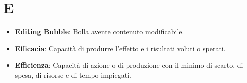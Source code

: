 \section{E}
\begin{itemize}
	\item
	\textbf{Editing Bubble}: Bolla avente contenuto modificabile.
	\item
	\textbf{Efficacia}: Capacità di produrre l'effetto e i risultati voluti o sperati.
	\item
	\textbf{Efficienza}: Capacità di azione o di produzione con il minimo di scarto, di spesa, di risorse e di tempo impiegati.
\end{itemize}
\newpage